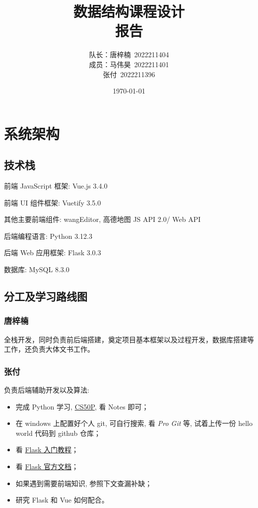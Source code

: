 \documentclass{ctexart}
\title{数据结构课程设计 \\ 报告}
\author{队长：唐梓楠\ 2022211404 \\ 成员：马伟昊\ 2022211401 \\\phantom{成员：}张\quad 付\ 2022211396}
\date{\today}
\begin{document}


\tableofcontents

\newpage

\maketitle

\section{系统架构}

\subsection{技术栈}

\begin{compactdesc}
    \item[前端 JavaScript 框架:] Vue.js 3.4.0
    \item[前端 UI 组件框架:] Vuetify 3.5.0
    \item[其他主要前端组件:] wangEditor, 高德地图 JS API 2.0/ Web API
    \item[后端编程语言:] Python 3.12.3
    \item[后端 Web 应用框架:] Flask 3.0.3
    \item[数据库:] MySQL 8.3.0
\end{compactdesc}

\subsection{分工及学习路线图}

\subsubsection{唐梓楠}

全栈开发，同时负责前后端搭建，奠定项目基本框架以及过程开发，数据库搭建等工作，还负责大体文书工作。

\subsubsection{张付}
负责后端辅助开发以及算法:

\begin{itemize}
    \item 完成 Python 学习, \href{https://cs50.harvard.edu/python/2022/}{CS50P}, 看 Notes 即可；
    \item 在 windows 上配置好个人 git, 可自行搜索, 看 \textit{Pro Git} 等, 试着上传一份 hello world 代码到 github 仓库；
    \item 看 \href{https://tutorial.helloflask.com}{Flask 入门教程}；
    \item 看 \href{https://dormousehole.readthedocs.io/en/latest/quickstart.html#}{Flask 官方文档}；
    \item 如果遇到需要前端知识, 参照下文查漏补缺；
    \item 研究 Flask 和 Vue 如何配合。
\end{itemize}
\end{document}
